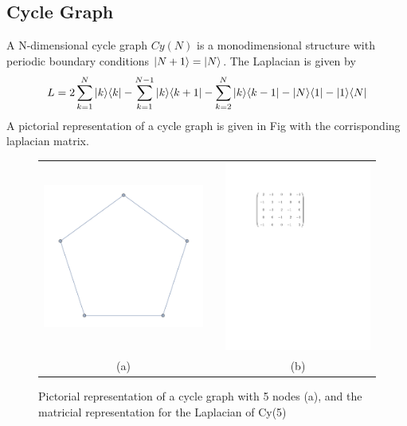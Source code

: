     \subsection{Cycle Graph}\label{subsec:cycle graph}
        A N-dimensional cycle graph $Cy(N)$ is a monodimensional structure with periodic boundary conditions ${|{N+1}\rangle}={|{N}\rangle}$. The Laplacian is given by
        \begin{equation}
            L = 2\sum_{k=1}^{N}{|{k}\rangle}{\langle{k}|} - \sum_{k=1}^{N-1}{|{k}\rangle}{\langle{k+1}|} - \sum_{k=2}^{N}{|{k}\rangle}{\langle{k-1}|}- {|{N}\rangle}{\langle{1}|}-{|{1}\rangle}{\langle{N}|}
        \end{equation}
        A pictorial representation of a cycle graph is given in Fig with the corrisponding laplacian matrix.
        \begin{figure}[ht]
          \centering
          \begin{tabular}{ccc}
            \includegraphics[width=55mm]{./figures/chapter1/cycle} & \hspace{20pt} &\includegraphics[width=50mm]{./figures/chapter1/Laplacian} \\[0.5cm]
          (a)  & & (b) \\[6pt]
          \end{tabular}
          \caption[Pictorial representation of a cycle graph, and matricial representation for the Laplacian]{Pictorial representation of a cycle graph with 5 nodes (a), and the matricial representation for the Laplacian of Cy(5)}
        \end{figure}
    \vspace{-0.7cm}
